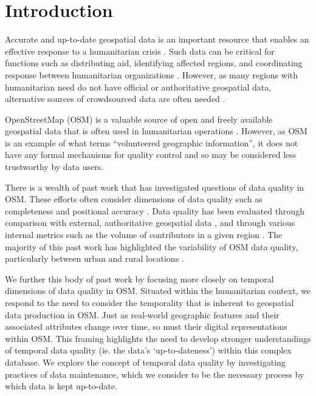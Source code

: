 \chapter{Introduction}
\label{chapterlabel1}

Accurate and up-to-date geospatial data is an important resource that enables an effective response to a humanitarian crisis \parencite{cowan_geospatial_2011, poser_volunteered_2010, soden_infrastructure_2016, zook_volunteered_2010}. Such data can be critical for functions such as distributing aid, identifying affected regions, and coordinating response between humanitarian organizations \parencite{soden_infrastructure_2016}. However, as many regions with humanitarian need do not have official or authoritative geospatial data, alternative sources of crowdsourced data are often needed \parencite{zook_volunteered_2010}. 

OpenStreetMap (OSM) is a valuable source of open and freely available geospatial data that is often used in humanitarian operations \parencite{palen_success_2015, soden_infrastructure_2016}. However, as OSM is an example of what \textcite{goodchild_citizens_2007} terms “volunteered geographic information”, it does not have any formal mechanisms for quality control and so may be considered less trustworthy by data users. 

There is a wealth of past work that has investigated questions of data quality in OSM. These efforts often consider dimensions of data quality such as completeness and positional accuracy \parencite{girres_quality_2010, haklay_how_2010}. Data quality has been evaluated through comparison with external, authoritative geospatial data \parencite{girres_quality_2010, haklay_how_2010, zielstra_comparative_2010}, and through various internal metrics such as the volume of contributors in a given region \parencite{haklay_how_2010-1}. The majority of this past work has highlighted the variability of OSM data quality, particularly between urban and rural locations \parencite{zielstra_comparative_2010}. 

We further this body of past work by focusing more closely on temporal dimensions of data quality in OSM. Situated within the humanitarian context, we respond to the need to consider the temporality that is inherent to geospatial data production in OSM. Just as real-world geographic features and their associated attributes change over time, so must their digital representations within OSM. This framing highlights the need to develop stronger understandings of temporal data quality (ie. the data’s ‘up-to-dateness’) within this complex database. We explore the concept of temporal data quality by investigating practices of data maintenance, which we consider to be the necessary process by which data is kept up-to-date. 

